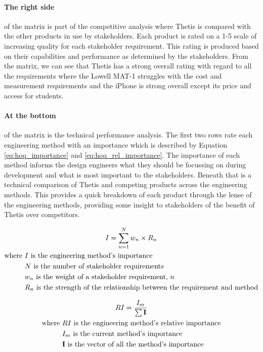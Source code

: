 \paragraph*{The right side} of the matrix is part of the competitive analysis where Thetis is compared with the other products in use by stakeholders.
Each product is rated on a 1-5 scale of increasing quality for each stakeholder requirement.
This rating is produced based on their capabilities and performance as determined by the stakeholders.
From the matrix, we can see that Thetis has a strong overall rating with regard to all the requirements where the Lowell MAT-1 struggles with the cost and measurement requirements and the iPhone is strong overall except its price and access for students.

\paragraph*{At the bottom} of the matrix is the technical performance analysis.
The first two rows rate each engineering method with an importance which is described by Equation \ref{eq:hoq_importance} and \ref{eq:hoq_rel_importance}.
The importance of each method informs the design engineers what they should be focussing on during development and what is most important to the stakeholders.
Beneath that is a technical comparison of Thetis and competing products across the engineering methods.
This provides a quick breakdown of each product through the lense of the engineering methods, providing some insight to stakeholders of the benefit of Thetis over competitors.

\begin{gather}
	\labeq{hoq_importance}
	I = \sum_{n=1}^N{w_n \times R_n} \\
	\begin{aligned}
		\text{where } &I \text{ is the engineering method's importance} \\
					  &N \text{ is the number of stakeholder requirements} \\
					  &w_n \text{ is the weight of a stakeholder requirement, } n \\
					  &R_n \text{ is the strength of the relationship between the requirement and method}
	\end{aligned} \notag
\end{gather}

\begin{gather}
	\labeq{hoq_rel_importance}
	RI = \frac{I_m}{\sum{\textbf{I}}} \\
	\begin{aligned}
		\text{where } &RI \text{ is the engineering method's relative importance} \\
					  &I_m \text{ is the current method's importance} \\
					  &\textbf{I} \text{ is the vector of all the method's importance} \\
	\end{aligned} \notag
\end{gather}


